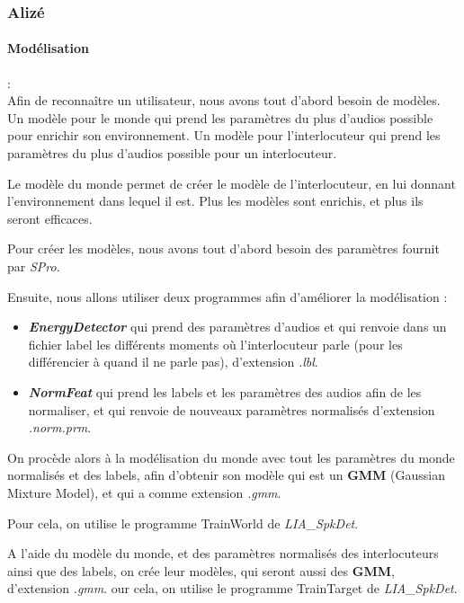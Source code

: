 \subsubsection{Alizé}
\label{sec:alizeImpl}


\paragraph*{Modélisation} : \\

Afin de reconnaître un utilisateur, nous avons tout d'abord besoin de modèles.
Un modèle pour le monde qui prend les paramètres du plus d'audios possible pour enrichir son environnement.
Un modèle pour l'interlocuteur qui prend les paramètres du plus d'audios possible pour un interlocuteur.

Le modèle du monde permet de créer le modèle de l'interlocuteur, en lui donnant l'environnement dans lequel il est.
Plus les modèles sont enrichis, et plus ils seront efficaces.

Pour créer les modèles, nous avons tout d'abord besoin des paramètres fournit par \textit{SPro}.

Ensuite, nous allons utiliser deux programmes afin d'améliorer la modélisation :
\begin{itemize}
      \item  \textit{\textbf{EnergyDetector}} qui prend des paramètres d'audios et qui renvoie dans un fichier label les différents moments où
            l'interlocuteur parle (pour les différencier à quand il ne parle pas), d'extension \textit{.lbl}.
      \item\textit{\textbf{ NormFeat }} qui prend les labels et les paramètres des audios afin de les normaliser, et qui renvoie de
            nouveaux paramètres normalisés d'extension \textit{.norm.prm}.
\end{itemize}


On procède alors à la modélisation du monde avec tout les paramètres du monde normalisés et des labels, afin d'obtenir son modèle qui est un \textbf{GMM}
(Gaussian Mixture Model), et qui a comme extension \textit{.gmm}.

Pour cela, on utilise le programme TrainWorld de \textit{  LIA\_SpkDet}.

A l'aide du modèle du monde, et des paramètres normalisés des interlocuteurs ainsi que des labels, on crée leur modèles, qui seront aussi des \textbf{GMM},
d'extension \textit{.gmm}.
our cela, on utilise le programme TrainTarget de \textit{ LIA\_SpkDet}.


